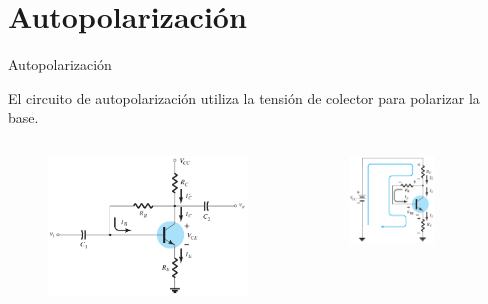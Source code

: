 \documentclass[t,aspectratio=169]{beamer}
\begin{document}
\section{Autopolarización}
\begin{frame}{Autopolarización}

El circuito de autopolarización utiliza la tensión de colector para polarizar la base.

\begin{columns}
\begin{column}{0.5\textwidth}

\begin{figure}[H]
    \centering
    \includegraphics[width=\textwidth]{figures/polarizacion_autopolarizacion.png}
\end{figure}

\end{column}
\begin{column}{0.5\textwidth}

\begin{figure}[H]
    \centering
    \includegraphics[width=0.7\textwidth]{figures/polarizacion_autopolarizacion_2.png}
\end{figure}

\end{column}
\end{columns}

\end{frame}
\end{document}
